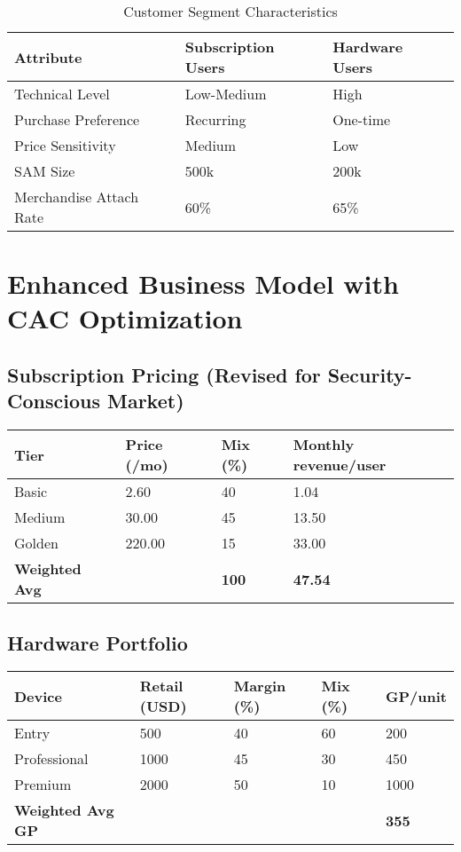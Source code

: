 \documentclass[11pt]{article}
\begin{document}
\begin{table}[H]
\centering
\caption{Customer Segment Characteristics}
\begin{tabularx}{\linewidth}{l X X}
\toprule
Attribute & Subscription Users & Hardware Users \\\midrule
Technical Level & Low-Medium & High \\
Purchase Preference & Recurring & One-time \\
Price Sensitivity & Medium & Low \\
SAM Size & 500k\cite{chainalysis2024,triple2023} & 200k\cite{chainalysis2024,triple2023} \\
Merchandise Attach Rate & 60\%\cite{shopify2024} & 65\%\cite{shopify2024} \\
\bottomrule
\end{tabularx}
\end{table}

\section{Enhanced Business Model with CAC Optimization}

\subsection{Subscription Pricing (Revised for Security-Conscious Market)}
\begin{table}[H]
\centering
\begin{tabularx}{\linewidth}{l Y Y Y}
\toprule
Tier & Price (/mo) & Mix (\%) & Monthly revenue/user \\\midrule
Basic   & 2.60  & 40 & 1.04 \\
Medium  & 30.00 & 45 & 13.50 \\
Golden  & 220.00& 15 & 33.00 \\\midrule
\textbf{Weighted Avg} &  & \textbf{100} & \textbf{47.54} \\
\bottomrule
\end{tabularx}
\end{table}

\subsection{Hardware Portfolio}
\begin{table}[H]
\centering
\begin{tabularx}{\linewidth}{l Y Y Y Y}
\toprule
Device & Retail (USD) & Margin (\%)\cite{ledger2023} & Mix (\%) & GP/unit \\\midrule
Entry        & 500  & 40 & 60 & 200 \\
Professional & 1000 & 45 & 30 & 450 \\
Premium      & 2000 & 50 & 10 & 1000 \\\midrule
\textbf{Weighted Avg GP} &  &  &  & \textbf{355} \\
\bottomrule
\end{tabularx}
\end{table}
\end{document}
